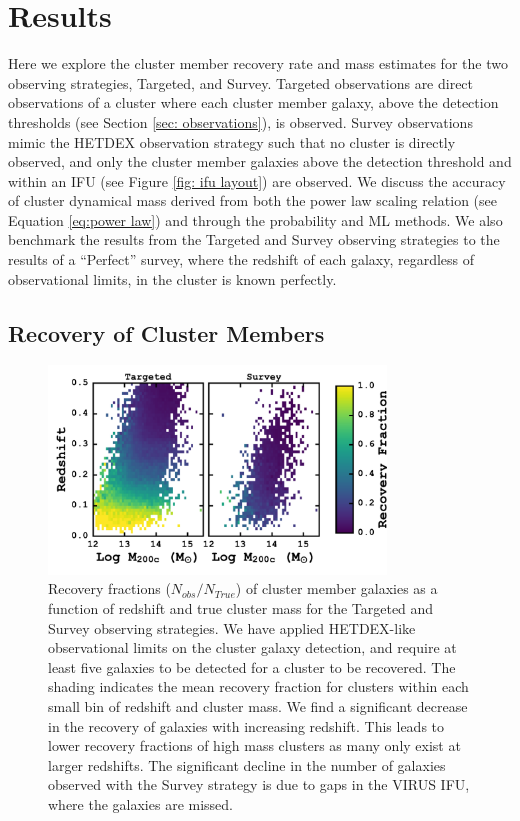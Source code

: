 \documentclass[fleqn,usenatbib]{mnras}
\begin{document}
\section{Results}\label{sec:results}
Here we explore the cluster member recovery rate and mass estimates for the two observing strategies, Targeted, and Survey. Targeted observations are direct observations of a cluster where each cluster member galaxy, above the detection thresholds (see Section \ref{sec: observations}), is observed. Survey observations mimic the HETDEX observation strategy such that no cluster is directly observed, and only the cluster member galaxies above the detection threshold and within an IFU (see Figure \ref{fig: ifu layout}) are observed.  We discuss the accuracy of cluster dynamical mass derived from both the power law scaling relation (see Equation \ref{eq:power law}) and through the probability and ML methods. We also benchmark the results from the Targeted and Survey observing strategies to the results of a ``Perfect'' survey, where the redshift of each galaxy, regardless of observational limits, in the cluster is known perfectly.

\subsection{Recovery of Cluster Members}
\begin{figure}
	\includegraphics[width=0.8\textwidth]{figures/recovery.pdf} 
	\caption[Recovery fractions for the Targeted and Survey observations.]{Recovery fractions ($N_{obs}/N_{True}$) of cluster member galaxies as a function of redshift and true cluster mass for the Targeted and Survey observing strategies. We have applied HETDEX-like observational limits on the cluster galaxy detection, and require at least five galaxies to be detected for a cluster to be recovered. The shading indicates the mean recovery fraction for clusters within each small bin of redshift and cluster mass. We find a significant decrease in the recovery of galaxies with increasing redshift. This leads to lower recovery fractions of high mass clusters as many only exist at larger redshifts. The significant decline in the number of galaxies observed with the Survey strategy is due to gaps in the VIRUS IFU, where the galaxies are missed.}
	\label{fig: recovery} 
\end{figure}
\end{document}
